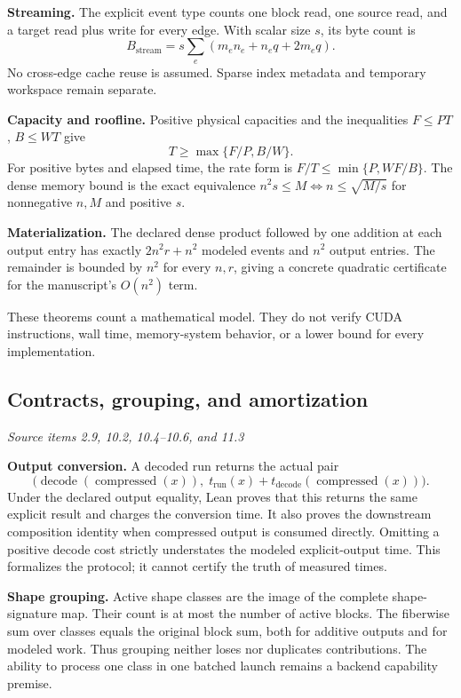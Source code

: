 \textbf{Streaming.} The explicit event type counts one block read, one source read, and a target read plus write for every edge. With scalar size $s$, its byte count is
\[
B_{\mathrm{stream}}=s\sum_e(m_en_e+n_eq+2m_eq).
\]
No cross-edge cache reuse is assumed. Sparse index metadata and temporary workspace remain separate.

\textbf{Capacity and roofline.} Positive physical capacities and the inequalities $F\leq PT$, $B\leq WT$ give
\[
T\geq\max\{F/P,B/W\}.
\]
For positive bytes and elapsed time, the rate form is $F/T\leq\min\{P,WF/B\}$. The dense memory bound is the exact equivalence $n^2s\leq M\iff n\leq\sqrt{M/s}$ for nonnegative $n,M$ and positive $s$.

\textbf{Materialization.} The declared dense product followed by one addition at each output entry has exactly $2n^2r+n^2$ modeled events and $n^2$ output entries. The remainder is bounded by $n^2$ for every $n,r$, giving a concrete quadratic certificate for the manuscript's $O(n^2)$ term.

These theorems count a mathematical model. They do not verify CUDA instructions, wall time, memory-system behavior, or a lower bound for every implementation.



\subsection{Contracts, grouping, and amortization}\label{supp2:subsection:006}\textit{Source items 2.9, 10.2, 10.4--10.6, and 11.3}\par
\textbf{Output conversion.} A decoded run returns the actual pair
\[
\bigl(\operatorname{decode}(\operatorname{compressed}(x)),
\;t_{\mathrm{run}}(x)+t_{\mathrm{decode}}(\operatorname{compressed}(x))\bigr).
\]
Under the declared output equality, Lean proves that this returns the same explicit result and charges the conversion time. It also proves the downstream composition identity when compressed output is consumed directly. Omitting a positive decode cost strictly understates the modeled explicit-output time. This formalizes the protocol; it cannot certify the truth of measured times.

\textbf{Shape grouping.} Active shape classes are the image of the complete shape-signature map. Their count is at most the number of active blocks. The fiberwise sum over classes equals the original block sum, both for additive outputs and for modeled work. Thus grouping neither loses nor duplicates contributions. The ability to process one class in one batched launch remains a backend capability premise.

